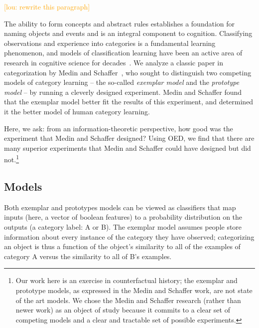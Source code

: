 \documentclass{article}
\newcommand{\lou}[1]{\textcolor{orange}{[lou: #1]}}
\begin{document}
\lou{rewrite this paragraph}

The ability to form concepts and abstract rules establishes a foundation for naming objects and events and is an integral component to cognition.
Classifying observations and experience into categories is a fundamental learning phenomenon, and models of classification learning have been an active area of research in cognitive science for decades~\cite{machery10:bbs}.
We analyze a classic paper in categorization by Medin and Schaffer~\cite{medin78:pr}, who sought to distinguish two competing models of category learning -- the so-called \emph{exemplar model} and the \emph{prototype model} -- by running a cleverly designed experiment.
Medin and Schaffer found that the exemplar model better fit the results of this experiment, and determined it the better model of human category learning.

Here, we ask: from an information-theoretic perspective, how good was the experiment that Medin and Schaffer designed?
Using OED, we find that there are many superior experiments that Medin and Schaffer could have designed but did not.\footnote{Our work here is an exercise in counterfactual history; the exemplar and prototype models, as expressed in the Medin and Schaffer work, are not state of the art models. We chose the Medin and Schaffer research (rather than newer work) as an object of study because it commits to a clear set of competing models and a clear and tractable set of possible experiments.}



\subsection{Models}

Both exemplar and prototypes models can be viewed as classifiers that map inputs (here, a vector of boolean features) to a probability distribution on the outputs (a category label: A or B).
The exemplar model assumes people store information about every instance of the category they have observed; categorizing an object is thus a function of the object's similarity to all of the examples of category A versus the similarity to all of B's examples.
\end{document}
